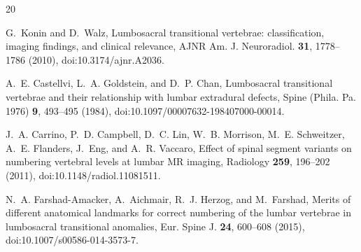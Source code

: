 \documentclass[aapm,mph,amsmath,amssymb,preprint,linenumbers]{revtex4-2}
\begin{document}
\begin{thebibliography}{20}
%
%
\sloppy

G.~Konin and D.~Walz,
\newblock Lumbosacral transitional vertebrae: classification, imaging findings, and clinical relevance,
\newblock AJNR Am. J. Neuroradiol. {\bf 31}, 1778--1786 (2010),
\newblock doi:10.3174/ajnr.A2036.

A.~E. Castellvi, L.~A. Goldstein, and D.~P. Chan,
\newblock Lumbosacral transitional vertebrae and their relationship with lumbar extradural defects,
\newblock Spine (Phila. Pa. 1976) {\bf 9}, 493--495 (1984),
\newblock doi:10.1097/00007632-198407000-00014.

J.~A. Carrino, P.~D. Campbell, D.~C. Lin, W.~B. Morrison, M.~E. Schweitzer, A.~E. Flanders, J.~Eng, and A.~R. Vaccaro,
\newblock Effect of spinal segment variants on numbering vertebral levels at lumbar {MR} imaging,
\newblock Radiology {\bf 259}, 196--202 (2011),
\newblock doi:10.1148/radiol.11081511.

N.~A. Farshad-Amacker, A.~Aichmair, R.~J. Herzog, and M.~Farshad,
\newblock Merits of different anatomical landmarks for correct numbering of the lumbar vertebrae in lumbosacral transitional anomalies,
\newblock Eur. Spine J. {\bf 24}, 600--608 (2015),
\newblock doi:10.1007/s00586-014-3573-7.


\end{thebibliography}
\end{document}
